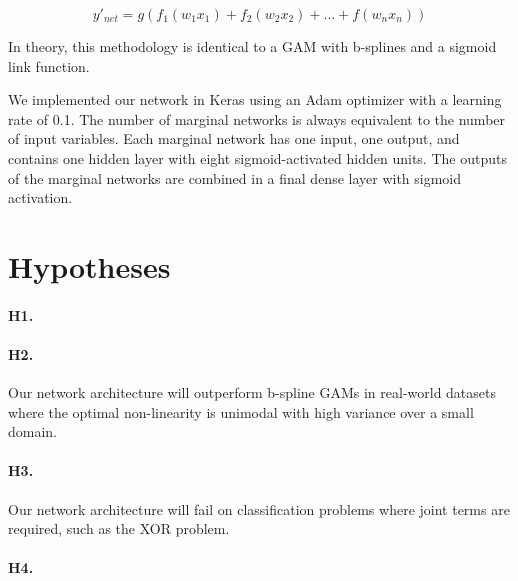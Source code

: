 \begin{equation}
    \label{eq:network}
    y'_{net} = g(f_1(w_1 x_1) + f_2(w_2 x_2) + ... + f(w_n x_n))
\end{equation}

In theory, this methodology is identical to a GAM with b-splines and a sigmoid link function. 

We implemented our network in Keras \citep{Chollet2019Keras} using an Adam optimizer \citep{Kingma2014Adam:Optimization} with a learning rate of 0.1. The number of marginal networks is always equivalent to the number of input variables. Each marginal network has one input, one output, and contains one hidden layer with eight sigmoid-activated hidden units. The outputs of the marginal networks are combined in a final dense layer with sigmoid activation.

\section{Hypotheses}

\paragraph{H1.} 

\paragraph{H2.} Our network architecture will outperform b-spline GAMs in real-world datasets where the optimal non-linearity is unimodal with high variance over a small domain. 

\paragraph{H3.} Our network architecture will fail on classification problems where joint terms are required, such as the XOR problem. 

\paragraph{H4.} 

